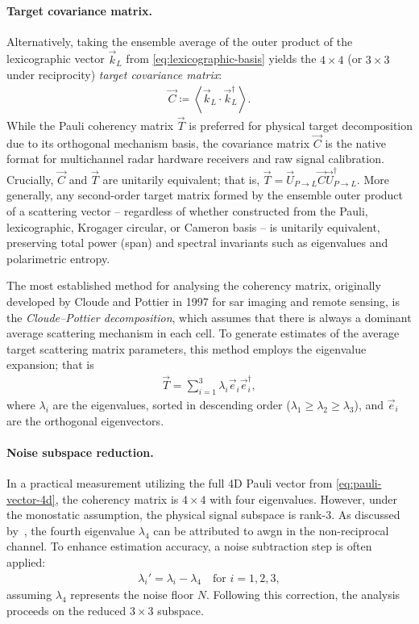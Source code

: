 \paragraph{Target covariance matrix.}
Alternatively, taking the ensemble average of the outer product of the lexicographic vector $\vec k_L$ from \cref{eq:lexicographic-basis} yields the $4 \times 4$ (or $3 \times 3$ under reciprocity) \emph{target covariance matrix}:
\begin{align}
    \label{eq:target-covariance-matrix}
    \vec C \coloneq \left\langle \vec k_L \cdot \vec k_L^\dagger \right\rangle.
\end{align}
While the Pauli coherency matrix $\vec T$ is preferred for physical target decomposition due to its orthogonal mechanism basis, the covariance matrix $\vec C$ is the native format for multichannel radar hardware receivers and raw signal calibration.
Crucially, $\vec C$ and $\vec T$ are unitarily equivalent; that is, $\vec T = \vec U_{P \to L} \vec C \vec U_{P \to L}^\dagger$.
More generally, any second-order target matrix formed by the ensemble outer product of a scattering vector -- regardless of whether constructed from the Pauli, lexicographic, Krogager circular, or Cameron basis -- is unitarily equivalent, preserving total power (span) and spectral invariants such as eigenvalues and polarimetric entropy.

The most established method for analysing the coherency matrix, originally developed by Cloude and Pottier in 1997 for \gls{sar} imaging and remote sensing, is the \emph{Cloude--Pottier decomposition}, which assumes that there is always a dominant average scattering mechanism in each cell.
To generate estimates of the average target scattering matrix parameters, this method employs the eigenvalue expansion; that is
\begin{align}
    \vec T = \sum_{i=1}^3 \lambda_i \vec e_i \vec e_i^\dagger,
\end{align}
where $\lambda_i$ are the eigenvalues, sorted in descending order ($\lambda_1 \ge \lambda_2 \ge \lambda_3$), and $\vec e_i$ are the orthogonal eigenvectors.

\paragraph{Noise subspace reduction.}
In a practical measurement utilizing the full 4D Pauli vector from \cref{eq:pauli-vector-4d}, the coherency matrix is $4 \times 4$ with four eigenvalues.
However, under the monostatic assumption, the physical signal subspace is rank-3.
As discussed by~\textcite{visentinPolarimetricRadarAutomotive2019}, the fourth eigenvalue $\lambda_4$ can be attributed to \gls{awgn} in the non-reciprocal channel.
To enhance estimation accuracy, a noise subtraction step is often applied:
\begin{align}
    \lambda_i' = \lambda_i - \lambda_4 \quad \text{for } i=1,2,3,
\end{align}
assuming $\lambda_4$ represents the noise floor $N$.
Following this correction, the analysis proceeds on the reduced $3 \times 3$ subspace.

